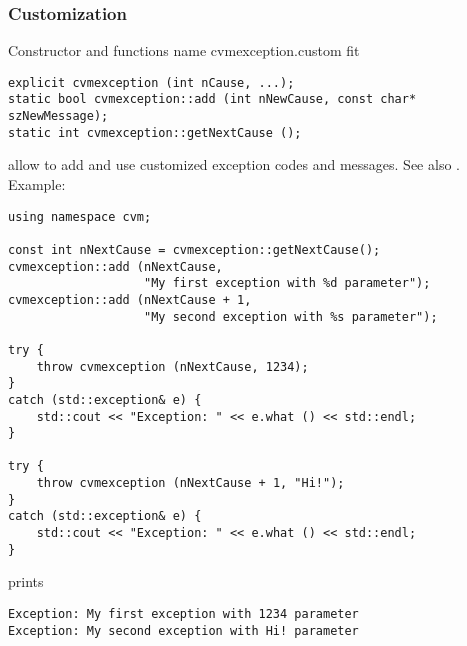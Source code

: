 \subsubsection{Customization}
Constructor and functions%
\pdfdest name {cvmexception.custom} fit
\begin{verbatim}
explicit cvmexception (int nCause, ...);
static bool cvmexception::add (int nNewCause, const char* szNewMessage);
static int cvmexception::getNextCause ();
\end{verbatim}
allow to add and use customized exception codes and messages.
See also .
Example:
\begin{Verbatim}
using namespace cvm;

const int nNextCause = cvmexception::getNextCause();
cvmexception::add (nNextCause, 
                   "My first exception with %d parameter");
cvmexception::add (nNextCause + 1, 
                   "My second exception with %s parameter");

try {
    throw cvmexception (nNextCause, 1234);
}
catch (std::exception& e) {
    std::cout << "Exception: " << e.what () << std::endl;
}

try {
    throw cvmexception (nNextCause + 1, "Hi!");
}
catch (std::exception& e) {
    std::cout << "Exception: " << e.what () << std::endl;
}
\end{Verbatim}
prints
\begin{Verbatim}
Exception: My first exception with 1234 parameter
Exception: My second exception with Hi! parameter
\end{Verbatim}
\newpage



